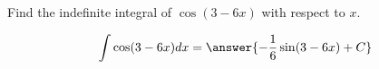 \documentclass{ximera}
\author{Gregory Hartman \and Matthew Carr}
\begin{document}
\begin{exercise}

Find the indefinite integral of $\cos(3-6x)$ with respect to $x$.

\[
\int \cos(3-6x) dx=\answer{-\frac{1}{6}\sin(3-6x)+C}
\]


\end{exercise}
\end{document}
